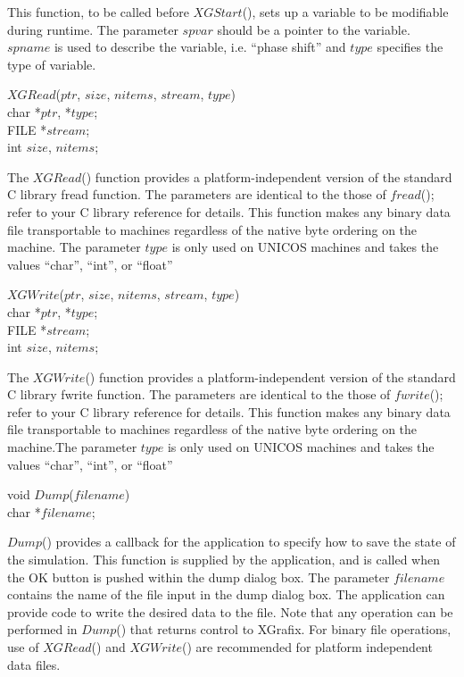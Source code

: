 This function, to be called before $XGStart$(), sets up a variable to be 
modifiable during runtime.  The parameter $spvar$ should be a pointer to 
the variable.  $spname$ is used to describe the variable, i.e. ``phase shift'' 
and $type$ specifies the type of variable.

\begin{flushleft}
$XGRead$($ptr$, $size$, $nitems$, $stream$, $type$) \\
char *$ptr$, *$type$; \\
FILE *$stream$;       \\
int $size$, $nitems$;
\end{flushleft}

The $XGRead$() function provides a platform-independent version of the 
standard C library fread function.  The parameters are identical to the those
of $fread$(); refer to your C library reference for details.  This function
makes any binary data file transportable to machines regardless of the native
byte ordering on the machine.  The parameter $type$ is only used on
UNICOS machines and takes the values ``char'', ``int'', or ``float''

\newpage

\begin{flushleft}
$XGWrite$($ptr$, $size$, $nitems$, $stream$, $type$) \\
char *$ptr$, *$type$;  \\
FILE *$stream$;        \\
int $size$, $nitems$;
\end{flushleft}

The $XGWrite$() function provides a platform-independent version of the 
standard C library fwrite function.  The parameters are identical to the those
of $fwrite$(); refer to your C library reference for details.  This function
makes any binary data file transportable to machines regardless of the native
byte ordering on the machine.The parameter $type$ is only used on
UNICOS machines and takes the values ``char'', ``int'', or ``float''

\begin{flushleft}
void $Dump$($filename$) \\
char *$filename$;
\end{flushleft}

$Dump$() provides a callback for the application to specify how to save
the state of the simulation.  This function is supplied by the application, 
and is called when the OK button is pushed within the dump dialog box.  The
parameter $filename$ contains the name of the file input in the dump dialog box.
The application can provide code to write the desired data to the file.  
Note that any operation can be performed in $Dump$() that returns control
to XGrafix.  For binary file operations, use of $XGRead$() and $XGWrite$() are 
recommended for platform independent data files.

